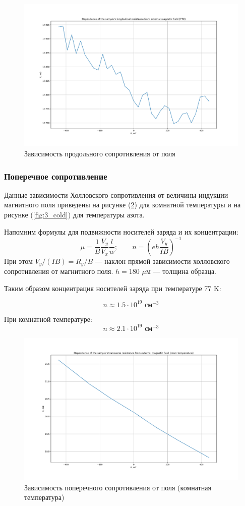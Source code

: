 \documentclass[a4paper, 12pt]{article}
\begin{document}
\begin{figure}[H]
	\centering
	\includegraphics[width=\linewidth]{3_longitudunal.pdf}
	\caption{Зависимость продольного сопротивления от поля}
	\label{fig:3_long}
\end{figure}

\subsubsection{Поперечное сопротивление}

Данные зависимости Холловского сопротивления от величины индукции магнитного поля приведены на рисунке (\ref{fig:3_room}) для комнатной температуры и на рисунке (\ref{fig:3_cold}) для температуры азота.

Напомним формулы для подвижности носителей заряда и их концентрации:
$$\mu=\frac{1}{B}\frac{V_y}{V_x}\frac{l}{w}; \qquad n=\left(eh\frac{V_y}{IB}\right)^{-1}  $$
При этом $V_y/(IB) = R_y/B$ --- наклон прямой зависимости холловского сопротивления от магнитного поля. $h = 180$ $\mu$м --- толщина образца.

Таким образом концентрация носителей заряда при температуре 77 K:

$$n\approx1.5 \cdot 10^{19}\text{ см}^{-3}$$ 

При комнатной температуре:
$$n\approx2.1 \cdot 10^{19}\text{ см}^{-3}$$ 
\begin{figure}[H]
	\centering
	\includegraphics[width=0.8\linewidth]{3_room.pdf}
	\caption{Зависимость поперечного сопротивления от поля (комнатная температура)}
	\label{fig:3_room}
\end{figure}
\end{document}
